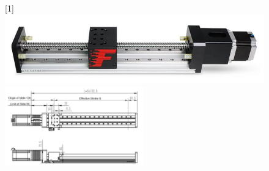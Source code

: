 \begin{figure}
    \begin{minipage}[b]{.45\linewidth}
        \centering
        \scalebox{-1}[1]{\includegraphics[width = 0.45\linewidth]{images/Linear_Actuator.jpg}}
        \includegraphics[width = 6cm]{images/Linear_Actuator(Design).jpg}
        \label{linear actuator}
    \end{minipage}\hfill
    

\end{figure}

